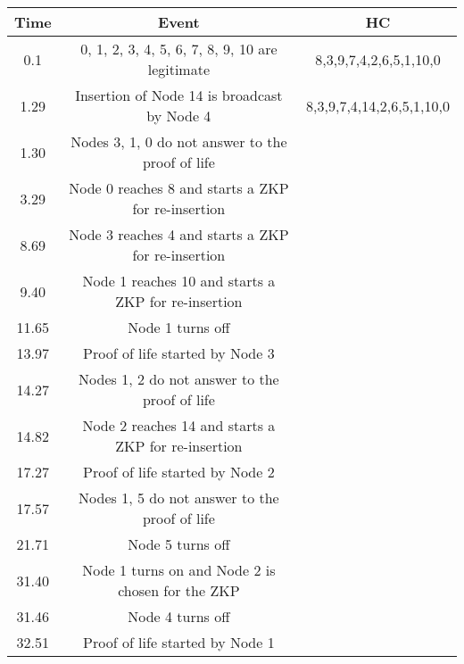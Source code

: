 \documentclass[conference]{IEEEtran}
\begin{document}
\begin{table*}[htb]
\begin{center}
\begin{tabular}{|c|c|c|} \hline
Time& Event  & HC  \\ \hline

0.1 & \scriptsize{0, 1, 2, 3, 4, 5, 6, 7, 8, 9, 10 are legitimate}  &
\scriptsize{8,3,9,7,4,2,6,5,1,10,0}\\

1.29 & \scriptsize{Insertion of Node 14 is broadcast by Node 4}  &
\scriptsize{8,3,9,7,4,14,2,6,5,1,10,0  } \\

1.30 &\scriptsize{ Nodes 3, 1, 0 do not answer to the proof of life}  &
\\

3.29 & \scriptsize{Node 0 reaches 8 and starts a ZKP for re-insertion} & \\

8.69 & \scriptsize{Node 3 reaches 4 and starts a ZKP for re-insertion } & \\

9.40 &\scriptsize{ Node 1 reaches 10 and starts a ZKP for re-insertion} &
\\

11.65 &\scriptsize{ Node 1 turns off }& \\

13.97 & \scriptsize{Proof of life started by Node 3} & \\

14.27 & \scriptsize{Nodes 1, 2 do not answer to the proof of life}  & \\

14.82 &\scriptsize{ Node 2 reaches 14 and starts a ZKP for re-insertion } &
\\

17.27 &\scriptsize{ Proof of life started by Node 2} & \\

17.57 & \scriptsize{Nodes 1, 5 do not answer to the proof of life  } & \\

21.71 & \scriptsize{Node 5 turns off }& \\

31.40 & \scriptsize{Node 1  turns on and Node 2 is chosen for the ZKP }& \\

31.46 &\scriptsize{ Node 4 turns off }& \\

32.51 & \scriptsize{Proof of life started by Node 1} & \\


\end{tabular}
\end{center}
\end{table*}
\end{document}
